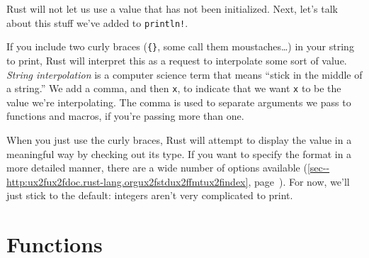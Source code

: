 \documentclass[a4paper,]{book}
\renewcommand*{\hyperref}[2][\ar]{%
  \def\ar{#2}%
  #2 (\autoref{#1}, page~\pageref{#1})}
\newenvironment{Shaded}{\begin{snugshade}}{\end{snugshade}}
\newcommand{\KeywordTok}[1]{\textcolor[rgb]{0.13,0.29,0.53}{\textbf{{#1}}}}
\newcommand{\StringTok}[1]{\textcolor[rgb]{0.31,0.60,0.02}{{#1}}}
\newcommand{\NormalTok}[1]{{#1}}
\begin{document}
\begin{Shaded}
\end{Shaded}

Rust will not let us use a value that has not been initialized. Next,
let's talk about this stuff we've added to \texttt{println!}.

If you include two curly braces (\texttt{\{\}}, some call them
moustaches\ldots{}) in your string to print, Rust will interpret this as
a request to interpolate some sort of value. \emph{String interpolation}
is a computer science term that means ``stick in the middle of a
string.'' We add a comma, and then \texttt{x}, to indicate that we want
\texttt{x} to be the value we're interpolating. The comma is used to
separate arguments we pass to functions and macros, if you're passing
more than one.

When you just use the curly braces, Rust will attempt to display the
value in a meaningful way by checking out its type. If you want to
specify the format in a more detailed manner, there are a
\hyperref[sec--http:ux2fux2fdoc.rust-lang.orgux2fstdux2ffmtux2findex]{wide
number of options available}. For now, we'll just stick to the default:
integers aren't very complicated to print.

\section{Functions}\label{sec--functions}
\end{document}
